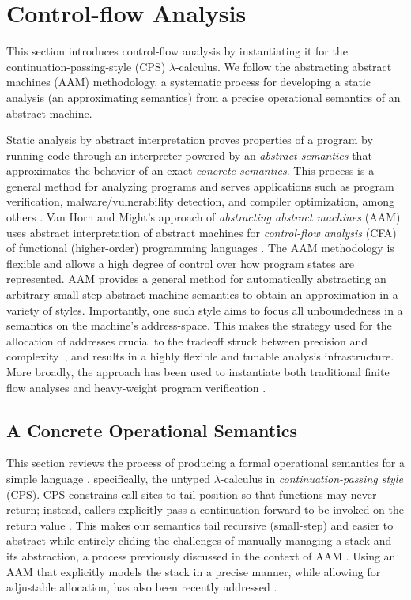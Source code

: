 

\section{Control-flow Analysis} 
\label{sec:aam}
%
This section introduces control-flow analysis by instantiating it for the continuation-passing-style (CPS)
$\lambda$-calculus. 
%
We follow the abstracting abstract machines (AAM) methodology, a systematic process for developing a static analysis
(an approximating semantics) from a precise operational semantics of an abstract machine.


Static analysis by abstract interpretation proves properties of a program by running code through an interpreter powered by an 
\textit{abstract semantics} that approximates the behavior of an exact \textit{concrete semantics}.
%
This process is a general method for analyzing programs and serves applications such as program verification, malware/vulnerability detection, and
compiler optimization, among others 
\cite{cousot:1976:staticdetermination,cousot:1977:unifiedlatticemodel,cousot:1979:systematicdesign,midtgaard:2012:cfa}.
%
Van Horn and Might's approach of \textit{abstracting abstract machines} (AAM) uses abstract interpretation of abstract machines for \textit{control-flow analysis} (CFA) of functional (higher-order) 
programming languages \cite{johnson:2013:oaam,might:2010:aam,might:2010:free}.
%
The AAM methodology is flexible and allows a high degree of control over how program states are represented.
%
AAM provides a general method for automatically abstracting an arbitrary small-step 
abstract-machine semantics to obtain an approximation in a variety of styles.
%
Importantly, one such style aims to focus all unboundedness in a semantics on the machine's address-space.
%
This makes the strategy used for the allocation of addresses crucial to the tradeoff struck between precision and complexity~\cite{gilray:2016:allocation}, and results in a highly flexible and tunable analysis infrastructure.
%
More broadly, the approach has been used to instantiate both traditional finite flow analyses and heavy-weight program verification \cite{nguyen:2014:SCV}. 


\subsection{A Concrete Operational Semantics}
\label{sec:aam:concrete}
%
This section reviews the process of producing a formal operational semantics for a simple language \cite{plotkin:1981:structural},
specifically, the untyped $\lambda$-calculus in \textit{continuation-passing style} (CPS).
%
CPS constrains call sites to tail position so that functions may never return; instead, callers explicitly pass a continuation forward to be invoked on the return value \cite{plotkin:1975:cps}.
%
This makes our semantics tail recursive (small-step) and easier to abstract while entirely eliding the challenges of manually managing a stack and its abstraction, a process previously discussed in the context of AAM \cite{might:2010:aam, johnson:2014:aac}.
%
Using an AAM that explicitly models the stack in a precise manner, while allowing for adjustable allocation, has also been recently addressed \cite{gilray:2016:p4f}.


